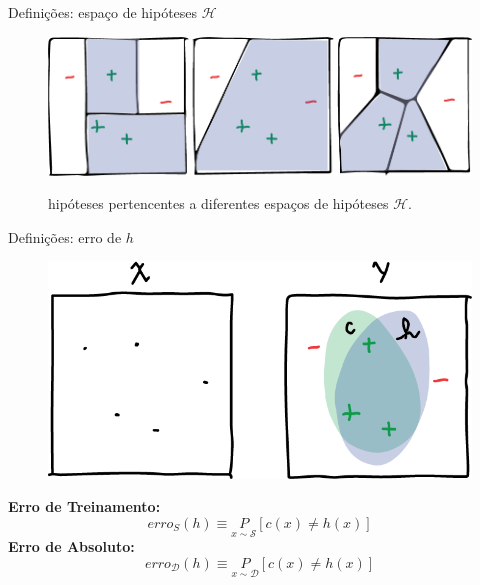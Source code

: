 \documentclass[10pt, professionalfonts]{beamer}
\begin{document}
{%
\begin{frame}{Definições: espaço de hipóteses  $\mathcal{H}$}
  \begin{figure}[!htp]
    \centering
    \includegraphics[width=.95\textwidth]{hspaces}
    \label{hspaces}
    \caption{hipóteses pertencentes a diferentes espaços de hipóteses $\mathcal{H}$.}
\end{figure}

\end{frame}

\begin{frame}{Definições: erro de $h$}
  \begin{figure}[!htp]
    \centering
    \includegraphics[width=.8\textwidth]{conceptVShypothesis}
    \label{conceptVShypothesis}
\end{figure}
\textbf{Erro de Treinamento:}\begin{equation}
  erro_{S}(h) \equiv \underset{x \sim \mathcal{S}}{P}[c(x) \neq h(x)]
\end{equation}
\textbf{Erro de Absoluto:}
\begin{equation}
  erro_{\mathcal{D}}(h) \equiv \underset{x \sim \mathcal{D}}{P}[c(x) \neq h(x)]
\end{equation}
\end{frame}




}
\end{document}

